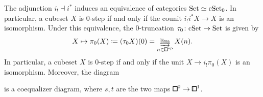 \begin{proposition}\label{prop:0-trunc-computation}
The adjunction $i_!\dashv i^\ast$ induces an equivalence of categories $\mathrm{Set}\simeq\mathrm{cSet}_0$.
In particular, a cubeset $X$ is $0$-step if and only if the counit $i_!i^\ast X\to X$ is an isomorphism.
Under this equivalence, the $0$-truncation $\tau_0\colon\mathrm{cSet}\to\mathrm{Set}$ is given by
\[
    X\mapsto\pi_0(X) \coloneq (\tau_0X)(0) = \varinjlim_{n\in{\bbox}^\op}X(n).
\]
In particular, a cubeset $X$ is $0$-step if and only if the unit $X\to i_!\pi_0(X)$ is an isomorphism.
Moreover, the diagram
\begin{center}
\end{center}
is a coequalizer diagram, where $s,t$ are the two maps ${\bbox}^0\to{\bbox}^1$.
\end{proposition}

